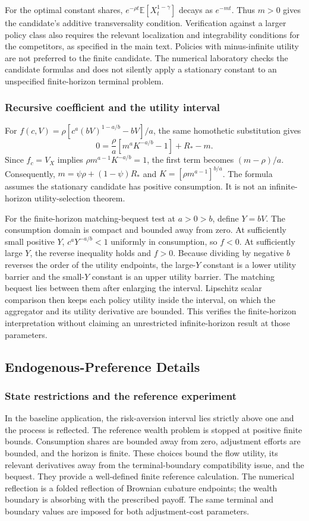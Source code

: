 \documentclass[ecta,nameyear,draft]{econsocart}
\theoremstyle{definition}
\theoremstyle{remark}
\newcommand{\E}{\mathbb E}
\begin{document}
For the optimal constant shares, $e^{-\rho t}\E[X_t^{1-\gamma}]$ decays as $e^{-m t}$. Thus $m>0$ gives the candidate's additive transversality condition. Verification against a larger policy class also requires the relevant localization and integrability conditions for the competitors, as specified in the main text. Policies with minus-infinite utility are not preferred to the finite candidate. The numerical laboratory checks the candidate formulas and does not silently apply a stationary constant to an unspecified finite-horizon terminal problem.

\subsubsection{Recursive coefficient and the utility interval}
For $f(c,V)=\rho[c^a(bV)^{1-a/b}-bV]/a$, the same homothetic substitution gives
\[
 0=\frac\rho a[m^aK^{-a/b}-1]+R_*-m.
\]
Since $f_c=V_X$ implies $\rho m^{a-1}K^{-a/b}=1$, the first term becomes $(m-\rho)/a$. Consequently, $m=\psi\rho+(1-\psi)R_*$ and $K=[\rho m^{a-1}]^{b/a}$. The formula assumes the stationary candidate has positive consumption. It is not an infinite-horizon utility-selection theorem.

For the finite-horizon matching-bequest test at $a>0>b$, define $Y=bV$. The consumption domain is compact and bounded away from zero. At sufficiently small positive $Y$, $c^aY^{-a/b}<1$ uniformly in consumption, so $f<0$. At sufficiently large $Y$, the reverse inequality holds and $f>0$. Because dividing by negative $b$ reverses the order of the utility endpoints, the large-$Y$ constant is a lower utility barrier and the small-$Y$ constant is an upper utility barrier. The matching bequest lies between them after enlarging the interval. Lipschitz scalar comparison then keeps each policy utility inside the interval, on which the aggregator and its utility derivative are bounded. This verifies the finite-horizon interpretation without claiming an unrestricted infinite-horizon result at those parameters.

\subsection{Endogenous-Preference Details}
\subsubsection{State restrictions and the reference experiment}
In the baseline application, the risk-aversion interval lies strictly above one and the process is reflected. The reference wealth problem is stopped at positive finite bounds. Consumption shares are bounded away from zero, adjustment efforts are bounded, and the horizon is finite. These choices bound the flow utility, its relevant derivatives away from the terminal-boundary compatibility issue, and the bequest. They provide a well-defined finite reference calculation. The numerical reflection is a folded reflection of Brownian cubature endpoints; the wealth boundary is absorbing with the prescribed payoff. The same terminal and boundary values are imposed for both adjustment-cost parameters.
\end{document}

